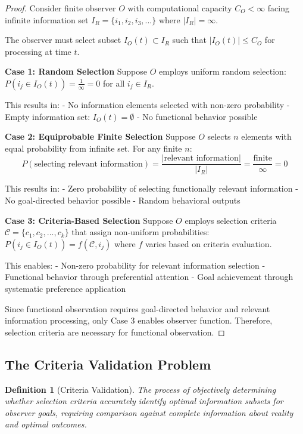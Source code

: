 \documentclass[12pt,a4paper]{article}
\newtheorem{definition}[theorem]{Definition}
\begin{document}
\begin{proof}
Consider finite observer $O$ with computational capacity $C_O < \infty$ facing infinite information set $I_R = \{i_1, i_2, i_3, ...\}$ where $|I_R| = \infty$.

The observer must select subset $I_O(t) \subset I_R$ such that $|I_O(t)| \leq C_O$ for processing at time $t$.

\textbf{Case 1: Random Selection}
Suppose $O$ employs uniform random selection: $P(i_j \in I_O(t)) = \frac{1}{\infty} = 0$ for all $i_j \in I_R$.

This results in:
- No information elements selected with non-zero probability
- Empty information set: $I_O(t) = \emptyset$
- No functional behavior possible

\textbf{Case 2: Equiprobable Finite Selection}
Suppose $O$ selects $n$ elements with equal probability from infinite set. For any finite $n$:
$$P(\text{selecting relevant information}) = \frac{|\text{relevant information}|}{|I_R|} = \frac{\text{finite}}{\infty} = 0$$

This results in:
- Zero probability of selecting functionally relevant information
- No goal-directed behavior possible
- Random behavioral outputs

\textbf{Case 3: Criteria-Based Selection}
Suppose $O$ employs selection criteria $\mathcal{C} = \{c_1, c_2, ..., c_k\}$ that assign non-uniform probabilities: $P(i_j \in I_O(t)) = f(\mathcal{C}, i_j)$ where $f$ varies based on criteria evaluation.

This enables:
- Non-zero probability for relevant information selection
- Functional behavior through preferential attention
- Goal achievement through systematic preference application

Since functional observation requires goal-directed behavior and relevant information processing, only Case 3 enables observer function. Therefore, selection criteria are necessary for functional observation.
\end{proof}

\subsection{The Criteria Validation Problem}

\begin{definition}[Criteria Validation]
The process of objectively determining whether selection criteria accurately identify optimal information subsets for observer goals, requiring comparison against complete information about reality and optimal outcomes.
\end{definition}
\end{document}
